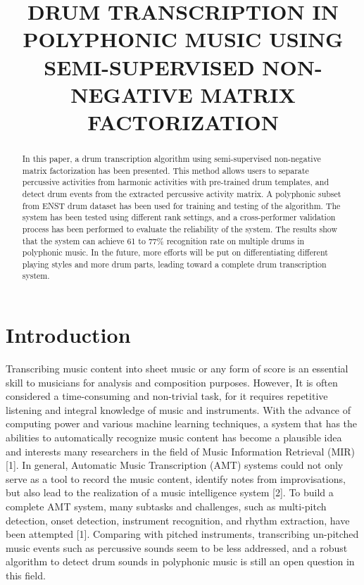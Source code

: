 \documentclass{article}
\title{DRUM TRANSCRIPTION IN POLYPHONIC MUSIC USING SEMI-SUPERVISED NON-NEGATIVE MATRIX FACTORIZATION}
\begin{document}
%
\maketitle
%
\begin{abstract}
In this paper, a drum transcription algorithm using semi-supervised non-negative matrix factorization has been presented. This method allows users to separate percussive activities from harmonic activities with pre-trained drum templates, and detect drum events from the extracted percussive activity matrix. A polyphonic subset from ENST drum dataset has been used for training and testing of the algorithm. The system has been tested using different rank settings, and a cross-performer validation process has been performed to evaluate the reliability of the system.  The results show that the system can achieve 61 to 77\% recognition rate on multiple drums in polyphonic music. In the future, more efforts will be put on differentiating different playing styles and more drum parts, leading toward a complete drum transcription system.

\end{abstract}
%

\section{Introduction}\label{sec:introduction}
Transcribing music content into sheet music or any form of score is an essential skill to musicians for analysis and composition purposes. However, It is often considered a time-consuming and non-trivial task, for it requires repetitive listening and integral knowledge of music and instruments. With the advance of computing power and various machine learning techniques, a system that has the abilities to automatically recognize music content has become a plausible idea and interests many researchers in the field of Music Information Retrieval (MIR) [1]. In general, Automatic Music Transcription (AMT) systems could not only serve as a tool to record the music content, identify notes from improvisations, but also lead to the realization of a music intelligence system [2]. To build a complete AMT system, many subtasks and challenges, such as multi-pitch detection, onset detection, instrument recognition, and rhythm extraction, have been attempted [1]. Comparing with pitched instruments, transcribing un-pitched music events such as percussive sounds seem to be less addressed, and a robust algorithm to detect drum sounds in polyphonic music is still an open question in this field.
\end{document}
